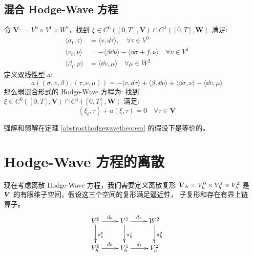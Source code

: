 \documentclass[lang=cn,a4paper,newtx]{elegantpaper}
\begin{document}
\subsection{混合 Hodge-Wave 方程}
令 $\boldsymbol{V} : = V^0\times V^1\times W^2$，找到 
$\xi \in C^0([0, T], \boldsymbol{V})\cap C^1([0, T], \boldsymbol{W})$ 满足:
\begin{equation}
    \label{mixedhodgewave}
    \begin{aligned}
        \langle \sigma_t, \tau\rangle &= \langle v, d\tau\rangle, \quad \forall \tau \in V^0\\
        \langle v_t, \nu\rangle & = -\langle \beta \dd \nu \rangle  - \langle
        \dd \sigma + f, \nu\rangle  \quad \forall \nu \in V^1\\
        \langle \beta_t, \mu\rangle &= \langle \dd v, \mu\rangle  \quad \forall \mu \in W^2
    \end{aligned}
\end{equation}
定义双线性型 $a$:
$$
a((\sigma, v, \beta), (\tau, \nu, \mu)) = -\langle v, d\tau\rangle + \langle
\beta, \dd \nu\rangle + \langle \dd \sigma, \nu\rangle - \langle \dd v,
\mu\rangle 
$$
那么弱混合形式的 Hodge-Wave 方程为: 找到 $\xi \in C^0([0, T],
\boldsymbol{V})\cap C^1([0, T], \boldsymbol{W})$ 满足:
\begin{equation}
\label{mixedhodgewave1}
(\xi_t, \tau) + a(\xi, \tau) = 0 \quad \forall \tau \in \boldsymbol{V}
\end{equation}

强解和弱解在定理 \ref{abstracthodgewavetheorem} 的假设下是等价的。

\section{Hodge-Wave 方程的离散}
现在考虑离散 Hodge-Wave 方程，我们需要定义离散复形 $\boldsymbol{V}_h = V_h^0\times
V_h^1\times V_h^2$ 是 $\boldsymbol{V}$ 的有限维子空间，假设这三个空间的复形满足逼近性，
子复形和存在有界上链算子。
$$
\begin{array}{c}
\xymatrix{
  V^{0} \ar[r]^-{d_{0}} \ar[d]^{\pi_h^{0}} & V^1 \ar[r]^-{d_1}
  \ar[d]^{\pi_h^1} & W^{2} \ar[d]^{\pi_h^{2}}   \\
  V_h^{0} \ar[r]^-{d_{0}} & V_h^1 \ar[r]^-{d_1} & V_h^{2}   }
\end{array}
$$
\end{document}
